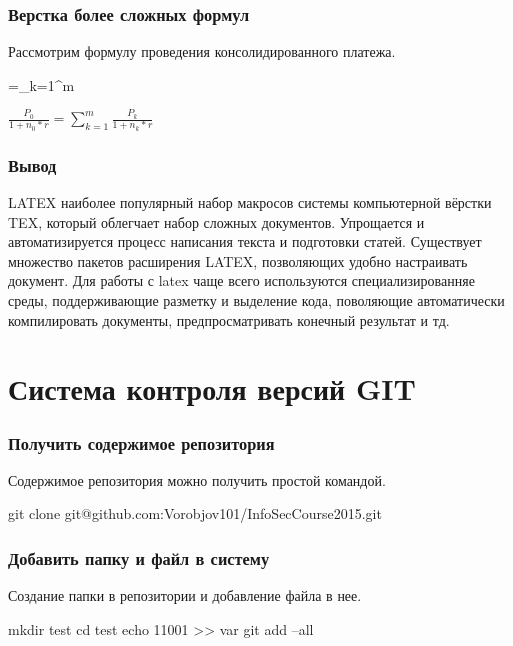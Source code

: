 \documentclass{article}
\begin{document}
\section[6]{Верстка более сложных формул}

Рассмотрим формулу проведения консолидированного платежа.
\begin{verbatim*}
	=\sum_{k=1}^{m}
\end{verbatim*}
\begin{math}
\frac{P_{0}}{1+n_{0}*r}=\sum_{k=1}^{m}\frac{P_{k}}{1+n_{k}*r}
\end{math}

\section[6]{Вывод}

LATEX наиболее популярный набор макросов системы компьютерной вёрстки TEX, который облегчает набор сложных документов. Упрощается и автоматизируется процесс написания текста и подготовки статей. Существует множество пакетов расширения LATEX, позволяющих удобно настраивать документ.
Для работы с latex чаще всего используются специализированняе среды, поддерживающие разметку и выделение кода, поволяющие автоматически компилировать документы, предпросматривать конечный результат и тд.

\part[2]{Система контроля версий GIT}

\section[1]{Получить содержимое репозитория}

Содержимое репозитория можно получить простой командой.
\begin{verbatim*}
git clone git@github.com:Vorobjov101/InfoSecCourse2015.git
\end{verbatim*}

\section[2]{Добавить папку и файл в систему}

Создание папки в репозитории и добавление файла в нее.
\begin{verbatim*}
mkdir test
cd test
echo 11001 >> var
git add --all
\end{verbatim*}
\end{document}
